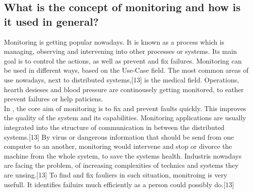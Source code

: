 \subsection{What is the concept of monitoring and how is it used in general?}
\label{subsec:ConceptMonitoring}

Monitoring is getting popular nowadays. It is known as a process which is managing, observing and intervening into other processes or systems. Its main goal is to control the actions, as well as prevent and fix failures. Monitoring can be used in different ways, based on the Use-Case field. The most common areas of use nowadays, next to distributed systems,[13] is the medical field. Operations, hearth desieses and blood pressure are continousely getting monitored, to eather prevent failures or help paticiens.
\\
 In \isds, the core aim of monitoring is to fix and prevent faults quickly. This improves the quality of the system and its capabilities. Monitoring applications are usually integrated into the structure of communication in between the distributed systems.[13] By virus or dangerous information that should be send from one computer to an another, monitoring would intervene and stop or divorce the machine from the whole system, to save the systems health. Industris nowadays are facing the problem, of increasing complexities of technics and systems they are unsing.[13] To find and fix fauliers in such situation, monitroing is very usefull. It identifies failuirs much efficiently as a person could possibly do.[13]
 
